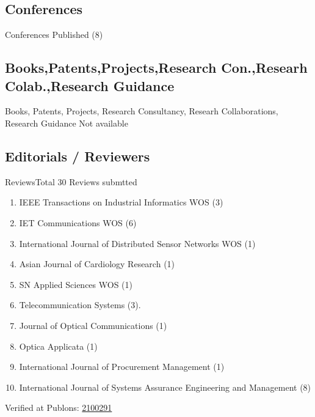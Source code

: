 \subsection{Conferences}
\begin{frame}[allowframebreaks]{Conferences Published (8)}{}
\begin{small}
   \begin{enumerate}[label={\textbf{[\arabic*]}\ }]
\item {}
\item {}
\item {}
\item {}
\item {}
\item {}
\item {}
\item {}
  \end{enumerate}  
  \end{small}
\end{frame}


\subsection{Books,Patents,Projects,Research Con.,Researh Colab.,Research Guidance}
\begin{frame}[allowframebreaks]{Books, Patents, Projects, Research Consultancy, Researh Collaborations, Research Guidance}{}
Not available
\end{frame}

\subsection{Editorials / Reviewers }
\begin{frame}[allowframebreaks]{Reviews}{Total 30 Reviews submtted}
 \begin{enumerate}[label={\textbf{\arabic*} }]
\item IEEE Transactions on Industrial Informatics WOS (3) 
\item IET Communications WOS (6)
\item International Journal of Distributed Sensor Networks WOS (1)
\item Asian Journal of Cardiology Research (1)
\item SN Applied Sciences WOS (1)
\item Telecommunication Systems (3).
\item Journal of Optical Communications (1)
\item Optica Applicata (1)
\item International Journal of Procurement Management (1)
\item International Journal of Systems Assurance Engineering and Management (8)
\end{enumerate}  
Verified at Publons: \href{https://publons.com/researcher/2100291/prateek-raj-gautam/peer-review/}{2100291}
\end{frame}

